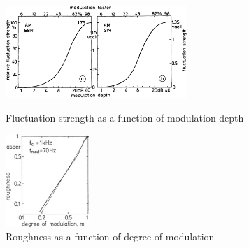 \documentclass[a4paper]{article}
\begin{document}
\begin{figure}[ht]
    \centering
    \begin{minipage}[b]{0.45\linewidth}
        \centering
        \includegraphics[height=3.5cm]
            {book/img/Fastl2007-FluctuationStrengthVsModulationDepth}
        \caption{Fluctuation strength as a function of modulation depth
            \cite[pp. 249]{Fastl2007Psychoacoustics}}
        \label{fig:flucstrenvsmoddep}
    \end{minipage}
    \quad
    \begin{minipage}[b]{0.45\linewidth}
        \centering
        \includegraphics[height=3.5cm]
            {book/img/Fastl2007-RoughnessDegreeModulation}
        \caption{Roughness as a function of degree of modulation
            \cite[pp. 258]{Fastl2007Psychoacoustics}}
        \label{fig:roughdegmod}
    \end{minipage}
\end{figure}



\end{document}

